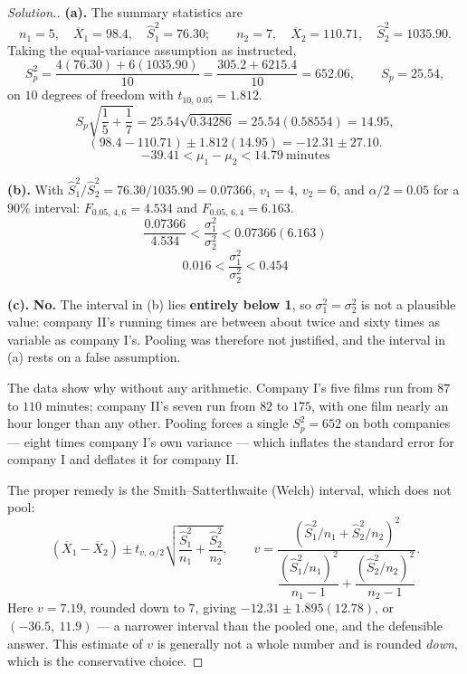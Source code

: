 \documentclass[11pt,a4paper]{article}
\theoremstyle{definition}
\newenvironment{solution}
  {\renewcommand{\qedsymbol}{}\begin{proof}[\textit{Solution}.]}
  {\end{proof}}
\begin{document}
\begin{solution}
\textbf{(a).} The summary statistics are
\[n_1=5,\quad \overline{X}_1=98.4,\quad \hat{S}_1^2=76.30;\qquad
n_2=7,\quad \overline{X}_2=110.71,\quad \hat{S}_2^2=1035.90.\]
Taking the equal-variance assumption as instructed,
\[S_p^2=\frac{4(76.30)+6(1035.90)}{10}=\frac{305.2+6215.4}{10}=652.06,
\qquad S_p=25.54,\]
on $10$ degrees of freedom with $t_{10,\,0.05}=1.812$.
\[S_p\sqrt{\frac{1}{5}+\frac{1}{7}}=25.54\sqrt{0.34286}=25.54(0.58554)=14.95,\]
\[(98.4-110.71)\pm 1.812(14.95)=-12.31\pm 27.10.\]
\[-39.41<\mu_1-\mu_2<14.79\ \text{minutes}\]

\textbf{(b).} With $\hat{S}_1^2/\hat{S}_2^2=76.30/1035.90=0.07366$, $v_1=4$, $v_2=6$, and
$\alpha/2=0.05$ for a $90\%$ interval: $F_{0.05,\,4,6}=4.534$ and $F_{0.05,\,6,4}=6.163$.
\[\frac{0.07366}{4.534}<\frac{\sigma_1^2}{\sigma_2^2}<0.07366(6.163)\]
\[0.016<\frac{\sigma_1^2}{\sigma_2^2}<0.454\]

\textbf{(c).} \textbf{No.} The interval in (b) lies \textbf{entirely below 1}, so
$\sigma_1^2=\sigma_2^2$ is not a plausible value: company II's running times are between
about twice and sixty times as variable as company I's. Pooling was therefore not
justified, and the interval in (a) rests on a false assumption.

The data show why without any arithmetic. Company I's five films run from $87$ to $110$
minutes; company II's seven run from $82$ to $175$, with one film nearly an hour longer
than any other. Pooling forces a single $S_p^2=652$ on both companies --- eight times
company I's own variance --- which inflates the standard error for company I and deflates
it for company II.

The proper remedy is the Smith--Satterthwaite (Welch) interval, which does not pool:
\[(\overline{X}_1-\overline{X}_2)\pm t_{v,\,\alpha/2}
\sqrt{\frac{\hat{S}_1^2}{n_1}+\frac{\hat{S}_2^2}{n_2}},\qquad
v=\frac{\left(\hat{S}_1^2/n_1+\hat{S}_2^2/n_2\right)^2}
{\dfrac{(\hat{S}_1^2/n_1)^2}{n_1-1}+\dfrac{(\hat{S}_2^2/n_2)^2}{n_2-1}}.\]
Here $v=7.19$, rounded down to $7$, giving $-12.31\pm 1.895(12.78)$, or
$(-36.5,\ 11.9)$ --- a narrower interval than the pooled one, and the defensible answer.
This estimate of $v$ is generally not a whole number and is rounded \emph{down}, which
is the conservative choice.
\end{solution}








\pagebreak
\end{document}
